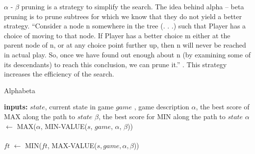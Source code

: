 \documentclass{ba-kecs}
\begin{document}
$\alpha$ - $\beta$ pruning is a strategy to simplify the search. The idea behind alpha – beta pruning is to prune subtrees for which we know that they do not yield a better strategy. “Consider a node n somewhere in the tree (. . .)  such that Player has a choice of moving to that node. If Player has a better choice m either at the parent node of n, or at any choice point further up, then n will never be reached in actual play. So, once we have found out enough about n (by examining some of its descendants) to reach this conclusion, we can prune it.” \cite{russell1995modern}. This strategy increases the efficiency of the search.

\begin{algorithm}
	\caption{Alphabeta}
	\label{alg:alphabeta}
	\begin{algorithmic}
		\State \textbf{inputs: } $state$, current state in game
		\State $game$ , game description
		\State $\alpha$, the best score of MAX along the path to $state$
		\State $\beta$, the best score for MIN along the path to $state$
		\State 
			\State {}
		\EndIf
			\State $\alpha$ $\leftarrow$ MAX($\alpha$, MIN-VALUE($s$, $game$, $\alpha$, $\beta$))
		\EndFor \label{}
		\EndFunction\\
		
		 \\
		\State {}
		\EndIf
			\State $ft$ $\leftarrow$ MIN($ft$, MAX-VALUE($s, game , \alpha, \beta$)) 
			\EndIf
		\EndFor \label{}
		\EndFunction
		
	\end{algorithmic}
\end{algorithm}
\end{document}
